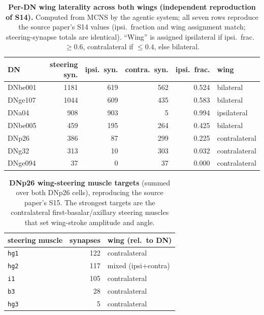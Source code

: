 \documentclass[11pt]{article}
\newcommand{\ttt}[1]{\texttt{\small #1}}
\begin{document}
\begin{table}[t]
\centering
\small
\caption{\textbf{Per-DN wing laterality across both wings (independent reproduction of S14).} Computed
from MCNS by the agentic system; all seven rows reproduce the source paper's S14 values (ipsi.\ fraction
and wing assignment match; steering-synapse totals are identical). ``Wing'' is assigned ipsilateral if
ipsi.\ frac.\ $\geq 0.6$, contralateral if $\leq 0.4$, else bilateral.}
\label{tab:s14}
\begin{tabular}{l r r r r l}
\toprule
\textbf{DN} & \textbf{steering syn.} & \textbf{ipsi.\ syn.} & \textbf{contra.\ syn.} & \textbf{ipsi.\ frac.} & \textbf{wing} \\
\midrule
DNbe001 & 1181 & 619 & 562 & 0.524 & bilateral \\
DNge107 & 1044 & 609 & 435 & 0.583 & bilateral \\
DNa04   &  908 & 903 &   5 & 0.994 & \textcolor{ipsi}{ipsilateral} \\
DNbe005 &  459 & 195 & 264 & 0.425 & bilateral \\
DNp26   &  386 &  87 & 299 & 0.225 & \textcolor{contra}{contralateral} \\
DNg32   &  313 &  10 & 303 & 0.032 & \textcolor{contra}{contralateral} \\
DNge094 &   37 &   0 &  37 & 0.000 & \textcolor{contra}{contralateral} \\
\bottomrule
\end{tabular}
\end{table}

\begin{table}[t]
\centering
\small
\caption{\textbf{DNp26 wing-steering muscle targets} (summed over both DNp26 cells), reproducing the
source paper's S15. The strongest targets are the contralateral first-basalar/axillary steering muscles
that set wing-stroke amplitude and angle.}
\label{tab:s15}
\begin{tabular}{l r l}
\toprule
\textbf{steering muscle} & \textbf{synapses} & \textbf{wing (rel.\ to DN)} \\
\midrule
\ttt{hg1} & 122 & contralateral \\
\ttt{hg2} & 117 & mixed (ipsi+contra) \\
\ttt{i1}  & 105 & contralateral \\
\ttt{b3}  &  28 & contralateral \\
\ttt{hg3} &   5 & contralateral \\
\bottomrule
\end{tabular}
\end{table}
\end{document}
